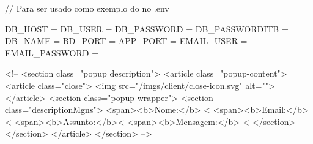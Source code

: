 // Para ser usado como exemplo do no .env 

DB_HOST = 
DB_USER = 
DB_PASSWORD = 
DB_PASSWORDITB = 
DB_NAME = 
BD_PORT = 
APP_PORT = 
EMAIL_USER =
EMAIL_PASSWORD =


<!-- 
                <section class="popup description">
                    <article class="popup-content">
                        <article class="close">
                            <img src="/imgs/client/close-icon.svg" alt="">
                        </article>
                        <section class="popup-wrapper">
                            <section class="descriptionMgns">
                                <span><b>Nome:</b> <%
                                <span><b>Email:</b><%
                                <span><b>Assunto:</b><%
                                <span><b>Mensagem:</b> <%
                            </section>
                        </section>
                    </article>
                </section>
 -->
